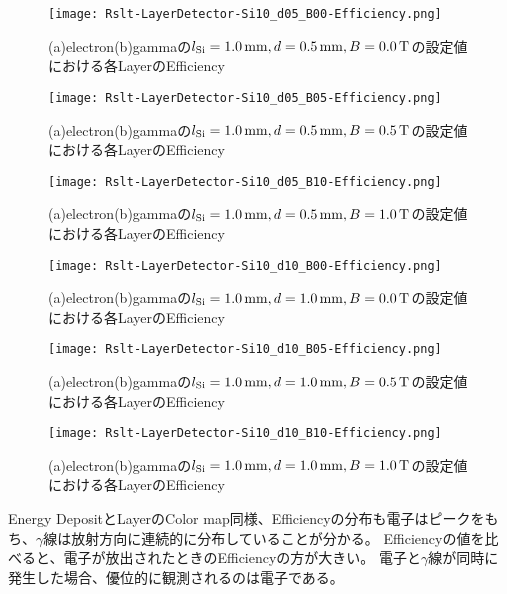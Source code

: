 \documentclass[a4paper,10pt]{jreport}
\begin{document}
\begin{figure}[H]
	\center
	\texttt{[image: Rslt-LayerDetector-Si10\_d05\_B00-Efficiency.png]}
	\caption{(a)electron(b)gammaの$l_{\rm{Si}}=\SI{1.0}{mm}, d=\SI{0.5}{mm}, B=\SI{0.0}{T}$の設定値における各LayerのEfficiency}
	\label{Rslt-LayerDetector-Si10_d05_B00-Efficiency}
\end{figure}

\begin{figure}[H]
	\center
	\texttt{[image: Rslt-LayerDetector-Si10\_d05\_B05-Efficiency.png]}
	\caption{(a)electron(b)gammaの$l_{\rm{Si}}=\SI{1.0}{mm}, d=\SI{0.5}{mm}, B=\SI{0.5}{T}$の設定値における各LayerのEfficiency}
	\label{Rslt-LayerDetector-Si10_d05_B05-Efficiency}
\end{figure}

\begin{figure}[H]
	\center
	\texttt{[image: Rslt-LayerDetector-Si10\_d05\_B10-Efficiency.png]}
	\caption{(a)electron(b)gammaの$l_{\rm{Si}}=\SI{1.0}{mm}, d=\SI{0.5}{mm}, B=\SI{1.0}{T}$の設定値における各LayerのEfficiency}
	\label{Rslt-LayerDetector-Si10_d05_B10-Efficiency}
\end{figure}

\begin{figure}[H]
	\center
	\texttt{[image: Rslt-LayerDetector-Si10\_d10\_B00-Efficiency.png]}
	\caption{(a)electron(b)gammaの$l_{\rm{Si}}=\SI{1.0}{mm}, d=\SI{1.0}{mm}, B=\SI{0.0}{T}$の設定値における各LayerのEfficiency}
	\label{Rslt-LayerDetector-Si10_d10_B00-Efficiency}
\end{figure}

\begin{figure}[H]
	\center
	\texttt{[image: Rslt-LayerDetector-Si10\_d10\_B05-Efficiency.png]}
	\caption{(a)electron(b)gammaの$l_{\rm{Si}}=\SI{1.0}{mm}, d=\SI{1.0}{mm}, B=\SI{0.5}{T}$の設定値における各LayerのEfficiency}
	\label{Rslt-LayerDetector-Si10_d10_B05-Efficiency}
\end{figure}

\begin{figure}[H]
	\center
	\texttt{[image: Rslt-LayerDetector-Si10\_d10\_B10-Efficiency.png]}
	\caption{(a)electron(b)gammaの$l_{\rm{Si}}=\SI{1.0}{mm}, d=\SI{1.0}{mm}, B=\SI{1.0}{T}$の設定値における各LayerのEfficiency}
	\label{Rslt-LayerDetector-Si05_d05_B00-Efficiency}
\end{figure}

Energy DepositとLayerのColor map同様、Efficiencyの分布も電子はピークをもち、$\gamma$線は放射方向に連続的に分布していることが分かる。
Efficiencyの値を比べると、電子が放出されたときのEfficiencyの方が大きい。
電子と$\gamma$線が同時に発生した場合、優位的に観測されるのは電子である。
\end{document}
